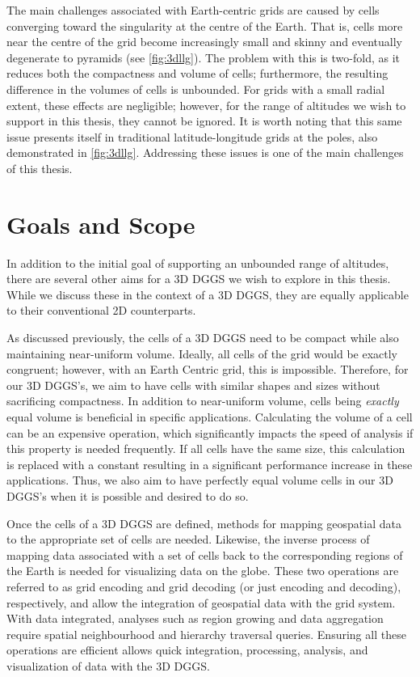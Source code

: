 The main challenges associated with Earth-centric grids are caused by cells converging toward the singularity at the centre of the Earth.
That is, cells more near the centre of the grid become increasingly small and skinny and eventually degenerate to pyramids
(see \cref{fig:3dllg}).
The problem with this is two-fold, as it reduces both the compactness and volume of cells; furthermore, the resulting difference in the volumes of cells is unbounded.
For grids with a small radial extent, these effects are negligible; however, for the range of altitudes we wish to support in this thesis, they cannot be ignored.
It is worth noting that this same issue presents itself in traditional latitude-longitude grids at the poles, also demonstrated in \cref{fig:3dllg}.
Addressing these issues is one of the main challenges of this thesis.


\section{Goals and Scope} \label{chap:1:goals}
In addition to the initial goal of supporting an unbounded range of altitudes, there are several other aims for a 3D DGGS we wish to explore in this thesis.
While we discuss these in the context of a 3D DGGS, they are equally applicable to their conventional 2D counterparts.



As discussed previously, the cells of a 3D DGGS need to be compact while also maintaining near-uniform volume.
Ideally, all cells of the grid would be exactly congruent; however, with an Earth Centric grid, this is impossible.
Therefore, for our 3D DGGS's, we aim to have cells with similar shapes and sizes without sacrificing compactness.
In addition to near-uniform volume, cells being \textit{exactly} equal volume is beneficial in specific applications.
Calculating the volume of a cell can be an expensive operation, which significantly impacts the speed of analysis if this property is needed frequently.
If all cells have the same size, this calculation is replaced with a constant resulting in a significant performance increase in these applications.
Thus, we also aim to have perfectly equal volume cells in our 3D DGGS's when it is possible and desired to do so.


Once the cells of a 3D DGGS are defined, methods for mapping geospatial data to the appropriate set of cells are needed.
Likewise, the inverse process of mapping data associated with a set of cells back to the corresponding regions of the Earth is needed for visualizing data on the globe.
These two operations are referred to as grid encoding and grid decoding (or just encoding and decoding), respectively, and allow the integration of geospatial data with the grid system.
With data integrated, analyses such as region growing and data aggregation require spatial neighbourhood and hierarchy traversal queries.
Ensuring all these operations are efficient allows quick integration, processing, analysis, and visualization of data with the 3D DGGS.


